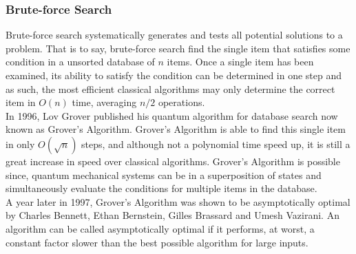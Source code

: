\documentclass[reqno]{amsart}
\numberwithin{equation}{section}
\numberwithin{figure}{section}
\begin{document}
\subsubsection{Brute-force Search}
\begin{justify}
Brute-force search systematically generates and tests all potential solutions to a problem. That is to say, brute-force search find the single item that satisfies some condition in a unsorted database of $n$ items. Once a single item has been examined, its ability to satisfy the condition can be determined in one step and as such, the most efficient classical algorithms may only determine the correct item in $O(n)$ time, averaging $n/2$ operations. \\

In 1996, Lov Grover published his quantum algorithm for database search \cite{Grover1996} now known as Grover's Algorithm. Grover's Algorithm is able to find this single item in only $O(\sqrt{n})$ steps, and although not a polynomial time speed up, it is still a great increase in speed over classical algorithms. Grover's Algorithm is possible since, quantum mechanical systems can be in a superposition of states and simultaneously evaluate the conditions for multiple items in the database. \\

A year later in 1997, Grover's Algorithm was shown to be asymptotically optimal by Charles Bennett, Ethan Bernstein, Gilles Brassard and Umesh Vazirani. \cite{BennettBernsteinBrassardVazirani1997} An algorithm can be called asymptotically optimal if it performs, at worst, a constant factor slower than the best possible algorithm for large inputs.
\end{justify}
\end{document}
